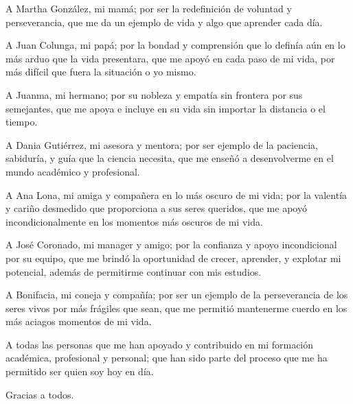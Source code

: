 %

A Martha González, mi mamá; por ser la redefinición de voluntad y perseverancia, que me da un ejemplo de vida y algo que aprender cada día.

A Juan Colunga, mi papá; por la bondad y comprensión que lo definía aún en lo más arduo que la vida presentara, que me apoyó en cada paso de mi vida, por más difícil que fuera la situación o yo mismo.

A Juanma, mi hermano; por su nobleza y empatía sin frontera por sus semejantes, que me apoya e incluye en su vida sin importar la distancia o el tiempo.

A Dania Gutiérrez, mi asesora y mentora; por ser ejemplo de la paciencia, sabiduría, y guía que la ciencia necesita, que me enseñó a desenvolverme en el mundo académico y profesional.

A Ana Lona, mi amiga y compañera en lo más oscuro de mi vida; por la valentía y cariño desmedido que proporciona a sus seres queridos, que me apoyó incondicionalmente en los momentos más oscuros de mi vida.

A José Coronado, mi manager y amigo; por la confianza y apoyo incondicional por su equipo, que me brindó la oportunidad de crecer, aprender, y explotar mi potencial, además de permitirme continuar con mis estudios.

A Bonifacia, mi coneja y compañía; por ser un ejemplo de la perseverancia de los seres vivos por más frágiles que sean, que me permitió mantenerme cuerdo en los más aciagos momentos de mi vida.

A todas las personas que me han apoyado y contribuido en mi formación académica, profesional y personal; que han sido parte del proceso que me ha permitido ser quien soy hoy en día.

Gracias a todos.